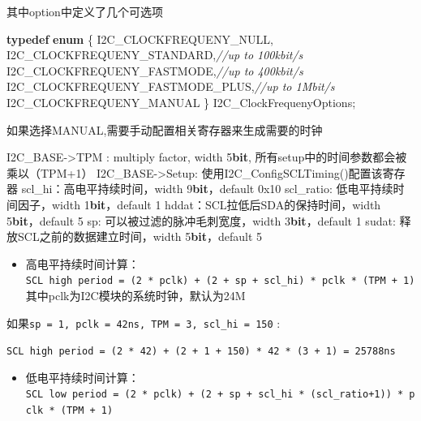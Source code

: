 \documentclass[
  12pt,
]{book}
\newenvironment{Shaded}{\begin{snugshade}}{\end{snugshade}}
\newcommand{\BaseNTok}[1]{\textcolor[rgb]{0.00,0.00,0.81}{#1}}
\newcommand{\CommentTok}[1]{\textcolor[rgb]{0.56,0.35,0.01}{\textit{#1}}}
\newcommand{\DecValTok}[1]{\textcolor[rgb]{0.00,0.00,0.81}{#1}}
\newcommand{\ErrorTok}[1]{\textcolor[rgb]{0.64,0.00,0.00}{\textbf{#1}}}
\newcommand{\KeywordTok}[1]{\textcolor[rgb]{0.13,0.29,0.53}{\textbf{#1}}}
\newcommand{\NormalTok}[1]{#1}
\providecommand{\tightlist}{%
  \setlength{\itemsep}{0pt}\setlength{\parskip}{0pt}}
\begin{document}
其中option中定义了几个可选项

\begin{Shaded}
\begin{Highlighting}[]
\KeywordTok{typedef} \KeywordTok{enum}
\NormalTok{\{}
\NormalTok{    I2C_CLOCKFREQUENY_NULL,}
\NormalTok{    I2C_CLOCKFREQUENY_STANDARD,}\CommentTok{//up to 100kbit/s}
\NormalTok{    I2C_CLOCKFREQUENY_FASTMODE,}\CommentTok{//up to 400kbit/s}
\NormalTok{    I2C_CLOCKFREQUENY_FASTMODE_PLUS,}\CommentTok{//up to 1Mbit/s}
\NormalTok{    I2C_CLOCKFREQUENY_MANUAL}
\NormalTok{\} I2C_ClockFrequenyOptions;}
\end{Highlighting}
\end{Shaded}

如果选择MANUAL,需要手动配置相关寄存器来生成需要的时钟

\begin{Shaded}
\begin{Highlighting}[]
\NormalTok{I2C_BASE->TPM : multiply factor, width }\DecValTok{5}\ErrorTok{bit}\NormalTok{, 所有setup中的时间参数都会被乘以（TPM+}\DecValTok{1}\NormalTok{）}
\NormalTok{I2C_BASE->Setup: 使用I2C_ConfigSCLTiming()配置该寄存器}
\NormalTok{  scl_hi：高电平持续时间，width }\DecValTok{9}\ErrorTok{bit}\NormalTok{，default }\BaseNTok{0x10} 
\NormalTok{  scl_ratio: 低电平持续时间因子，width }\DecValTok{1}\ErrorTok{bit}\NormalTok{，default }\DecValTok{1}
\NormalTok{  hddat：SCL拉低后SDA的保持时间，width }\DecValTok{5}\ErrorTok{bit}\NormalTok{，default }\DecValTok{5}
\NormalTok{  sp: 可以被过滤的脉冲毛刺宽度，width }\DecValTok{3}\ErrorTok{bit}\NormalTok{，default }\DecValTok{1}
\NormalTok{  sudat: 释放SCL之前的数据建立时间，width }\DecValTok{5}\ErrorTok{bit}\NormalTok{，default }\DecValTok{5}
\end{Highlighting}
\end{Shaded}

\begin{itemize}
\tightlist
\item
  高电平持续时间计算： \texttt{SCL\ high\ period\ =\ (2\ *\ pclk)\ +\ (2\ +\ sp\ +\ scl\_hi)\ *\ pclk\ *\ (TPM\ +\ 1)} 其中pclk为I2C模块的系统时钟，默认为24M
\end{itemize}

如果\texttt{sp\ =\ 1,\ pclk\ =\ 42ns,\ TPM\ =\ 3,\ scl\_hi\ =\ 150} :

\texttt{SCL\ high\ period\ =\ (2\ *\ 42)\ +\ (2\ +\ 1\ +\ 150)\ *\ 42\ *\ (3\ +\ 1)\ =\ 25788ns}

\begin{itemize}
\tightlist
\item
  低电平持续时间计算： \texttt{SCL\ low\ period\ =\ (2\ *\ pclk)\ +\ (2\ +\ sp\ +\ scl\_hi\ *\ (scl\_ratio+1))\ *\ pclk\ *\ (TPM\ +\ 1)}
\end{itemize}
\end{document}
